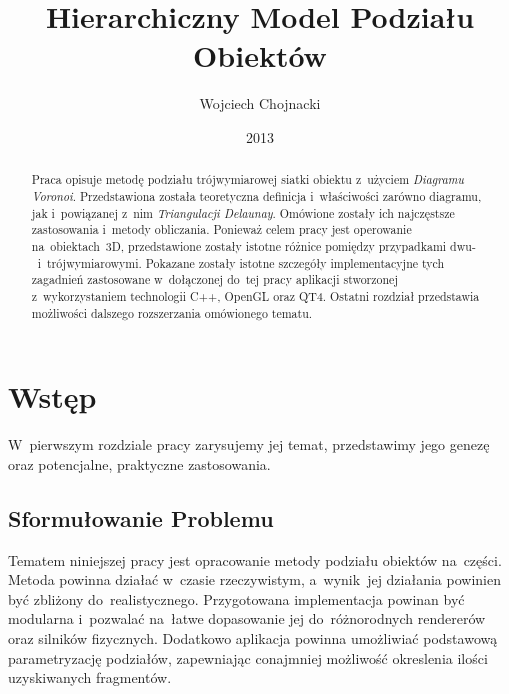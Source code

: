 \documentclass[skorowidz,autorrok,backref,xodstep,oswiadczenie]{wmimgr}
\author   {Wojciech Chojnacki}
\title    {Hierarchiczny Model Podziału Obiektów}
\date     {2013}
\begin{document}
\nocite{*} %

\begin{abstract}

Praca opisuje metodę podziału trójwymiarowej siatki obiektu z~użyciem \emph{Diagramu Voronoi}. Przedstawiona została teoretyczna definicja i~właściwości zarówno diagramu, jak i~powiązanej z~nim \emph{Triangulacji Delaunay}. Omówione zostały ich najczęstsze zastosowania i~metody obliczania. Ponieważ celem pracy jest operowanie na~obiektach~3D, przedstawione zostały istotne różnice pomiędzy przypadkami dwu-~i~trójwymiarowymi. Pokazane zostały istotne szczegóły implementacyjne tych zagadnień zastosowane w~dołączonej do~tej pracy aplikacji stworzonej z~wykorzystaniem technologii C++, OpenGL oraz QT4. Ostatni rozdział przedstawia możliwości dalszego rozszerzania omówionego tematu.

\end{abstract}

\maketitle

%
%
\listoffigures

%

%
\chapter{Wstęp}

W~pierwszym rozdziale pracy zarysujemy jej temat, przedstawimy jego genezę oraz potencjalne, praktyczne zastosowania.

\section{Sformułowanie Problemu}

Tematem niniejszej pracy jest opracowanie metody podziału obiektów na~części. Metoda powinna działać w~czasie rzeczywistym, a~wynik~jej działania powinien być zbliżony do~realistycznego. Przygotowana implementacja powinan być modularna i~pozwalać na~łatwe dopasowanie jej do~różnorodnych rendererów oraz silników fizycznych. Dodatkowo aplikacja powinna umożliwiać podstawową parametryzację podziałów, zapewniając conajmniej możliwość okreslenia ilości uzyskiwanych fragmentów.
\end{document}
